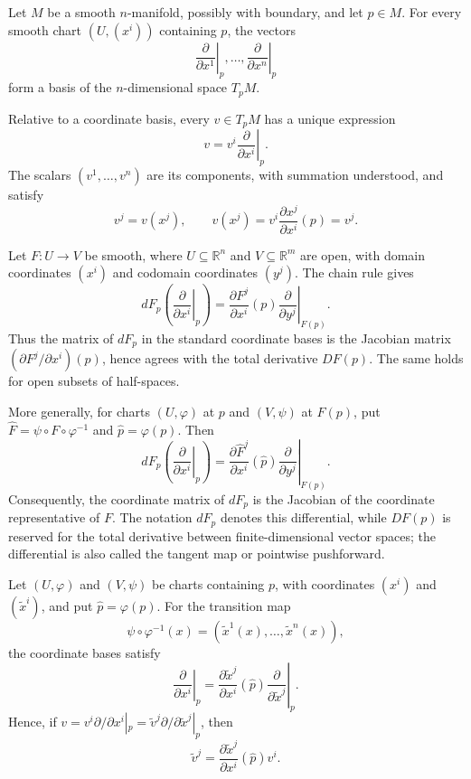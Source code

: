 \begin{proposition}
\label{prop:3-15}
\leanok
{}
Let $M$ be a smooth $n$-manifold, possibly with boundary, and let $p\in M$.
For every smooth chart $(U,(x^i))$ containing $p$, the vectors
\[
\left.\frac{\partial}{\partial x^1}\right|_p,\ldots,
\left.\frac{\partial}{\partial x^n}\right|_p
\]
form a basis of the $n$-dimensional space $T_pM$.
\end{proposition}

\begin{definition}
\label{def:3-15-extra-2}
\leanok
Relative to a coordinate basis, every $v\in T_pM$ has a unique expression
\[
v=\left.v^i\frac{\partial}{\partial x^i}\right|_p.
\]
The scalars $(v^1,\ldots,v^n)$ are its components, with summation understood,
and satisfy
\[
v^j=v(x^j),
\qquad
v(x^j)=v^i\frac{\partial x^j}{\partial x^i}(p)=v^j.
\]
\end{definition}

\begin{remark}
\label{rem:3-15-extra-3}
\mathlibok
Let $F:U\to V$ be smooth, where $U\subseteq\mathbb{R}^n$ and
$V\subseteq\mathbb{R}^m$ are open, with domain coordinates $(x^i)$ and
codomain coordinates $(y^j)$. The chain rule gives
\[
dF_p\left(\left.\frac{\partial}{\partial x^i}\right|_p\right)
=\left.\frac{\partial F^j}{\partial x^i}(p)
  \frac{\partial}{\partial y^j}\right|_{F(p)}. \tag{3.9}
\]
Thus the matrix of $dF_p$ in the standard coordinate bases is the Jacobian
matrix $(\partial F^j/\partial x^i)(p)$, hence agrees with the total derivative
$DF(p)$. The same holds for open subsets of half-spaces.

More generally, for charts $(U,\varphi)$ at $p$ and $(V,\psi)$ at $F(p)$,
put $\widehat F=\psi\circ F\circ\varphi^{-1}$ and
$\widehat p=\varphi(p)$. Then
\[
dF_p\left(\left.\frac{\partial}{\partial x^i}\right|_p\right)
=\left.\frac{\partial\widehat F^j}{\partial x^i}(\widehat p)
  \frac{\partial}{\partial y^j}\right|_{F(p)}. \tag{3.10}
\]
Consequently, the coordinate matrix of $dF_p$ is the Jacobian of the
coordinate representative of $F$. The notation $dF_p$ denotes this
differential, while $DF(p)$ is reserved for the total derivative between
finite-dimensional vector spaces; the differential is also called the tangent
map or pointwise pushforward.
\end{remark}

\begin{remark}
\label{rem:3-15-extra-4}
\mathlibok
Let $(U,\varphi)$ and $(V,\psi)$ be charts containing $p$, with coordinates
$(x^i)$ and $(\widetilde x^i)$, and put $\widehat p=\varphi(p)$. For the
transition map
\[
\psi\circ\varphi^{-1}(x)
=(\widetilde x^1(x),\ldots,\widetilde x^n(x)),
\]
the coordinate bases satisfy
\[
\left.\frac{\partial}{\partial x^i}\right|_p
=\left.\frac{\partial\widetilde x^j}{\partial x^i}(\widehat p)
  \frac{\partial}{\partial\widetilde x^j}\right|_p. \tag{3.11}
\]
Hence, if
$v=v^i\partial/\partial x^i|_p
=\widetilde v^j\partial/\partial\widetilde x^j|_p$, then
\[
\widetilde v^j
=\frac{\partial\widetilde x^j}{\partial x^i}(\widehat p)v^i. \tag{3.12}
\]
\end{remark}

